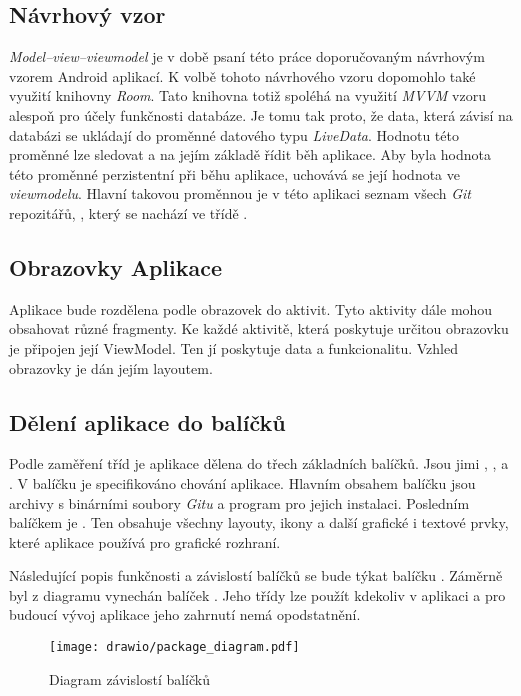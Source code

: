     \subsection{Návrhový vzor}
    \emph{Model–view–viewmodel} je v době psaní této práce doporučovaným návrhovým vzorem Android aplikací. K volbě tohoto návrhového vzoru dopomohlo také využití knihovny \emph{Room}. Tato knihovna totiž spoléhá na využití \emph{MVVM} vzoru alespoň pro účely funkčnosti databáze. Je tomu tak proto, že data, která závisí na databázi se ukládají do proměnné datového typu \emph{LiveData}. Hodnotu této proměnné lze sledovat a na jejím základě řídit běh aplikace. Aby byla hodnota této proměnné perzistentní při běhu aplikace, uchovává se její hodnota ve \emph{viewmodelu}. Hlavní takovou proměnnou je v této aplikaci seznam všech \emph{Git} repozitářů, , který se nachází ve třídě .
    
    \subsection{Obrazovky Aplikace}
    Aplikace bude rozdělena podle obrazovek do aktivit. Tyto aktivity dále mohou obsahovat různé fragmenty. Ke každé aktivitě, která poskytuje určitou obrazovku je připojen její ViewModel. Ten jí poskytuje data a funkcionalitu. Vzhled obrazovky je dán jejím layoutem.

    \newpage
    \subsection{Dělení aplikace do balíčků}
    Podle zaměření tříd je aplikace dělena do třech základních balíčků. Jsou jimi , , a . V balíčku  je specifikováno chování aplikace. Hlavním obsahem balíčku  jsou archivy s binárními soubory \emph{Gitu} a program  pro jejich instalaci. Posledním balíčkem je . Ten obsahuje všechny layouty, ikony a další grafické i textové prvky, které aplikace používá pro grafické rozhraní.

    Následující popis funkčnosti a závislostí balíčků se bude týkat balíčku . Záměrně byl z diagramu vynechán balíček . Jeho třídy lze použít kdekoliv v aplikaci a pro budoucí vývoj aplikace jeho zahrnutí nemá opodstatnění.

    \begin{figure}[h]
        \centering
        \vspace{0.5cm}
        \texttt{[image: drawio/package\_diagram.pdf]}
        \caption[Diagram závislostí balíčků]{Diagram závislostí balíčků}
        \label{diagram:packages}
    \end{figure}

